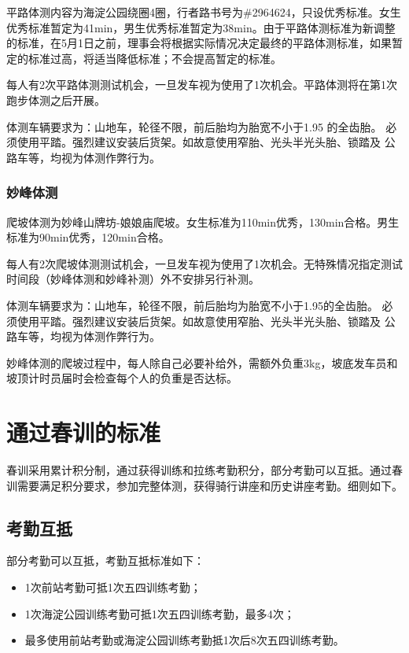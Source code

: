 \documentclass[UTF8]{ctexart}
\begin{document}
平路体测内容为海淀公园绕圈4圈，行者路书号为\#2964624，只设优秀标准。女生优秀标准暂定为41min，男生优秀标准暂定为38min。由于平路体测标准为新调整的标准，在5月1日之前，理事会将根据实际情况决定最终的平路体测标准，如果暂定的标准过高，将适当降低标准；不会提高暂定的标准。

每人有2次平路体测测试机会，一旦发车视为使用了1次机会。平路体测将在第1次跑步体测之后开展。

体测车辆要求为：山地车，轮径不限，前后胎均为胎宽不小于1.95 的全齿胎。
必须使用平踏。强烈建议安装后货架。如故意使用窄胎、光头半光头胎、锁踏及
公路车等，均视为体测作弊行为。

\subsubsection{妙峰体测}

爬坡体测为妙峰山牌坊-娘娘庙爬坡。女生标准为110min优秀，130min合格。男生标准为90min优秀，120min合格。

每人有2次爬坡体测测试机会，一旦发车视为使用了1次机会。无特殊情况指定测试时间段（妙峰体测和妙峰补测）外不安排另行补测。

体测车辆要求为：山地车，轮径不限，前后胎均为胎宽不小于1.95的全齿胎。
必须使用平踏。强烈建议安装后货架。如故意使用窄胎、光头半光头胎、锁踏及
公路车等，均视为体测作弊行为。

妙峰体测的爬坡过程中，每人除自己必要补给外，需额外负重3kg，坡底发车员和坡顶计时员届时会检查每个人的负重是否达标。

\section{通过春训的标准}

春训采用累计积分制，通过获得训练和拉练考勤积分，部分考勤可以互抵。通过春训需要满足积分要求，参加完整体测，获得骑行讲座和历史讲座考勤。细则如下。

\subsection{考勤互抵}

部分考勤可以互抵，考勤互抵标准如下：

\begin{itemize}[nosep,left=4em]
    \item 1次前站考勤可抵1次五四训练考勤；
    \item 1次海淀公园训练考勤可抵1次五四训练考勤，最多4次；
    \item 最多使用前站考勤或海淀公园训练考勤抵1次后8次五四训练考勤。 
\end{itemize}
\end{document}
